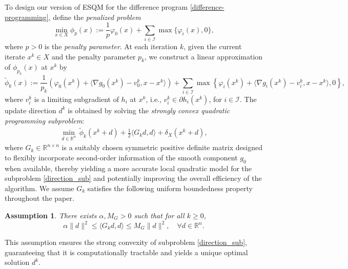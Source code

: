 \documentclass[11pt,a4paper]{article}
\newtheorem{assumption}[theorem]{Assumption}
\theoremstyle{plain}
\begin{document}
To design our version of ESQM for the difference program \eqref{difference-programming}, define the {\em penalized problem}
\begin{equation}\label{penalized_problem}
\min_{x \in X} \phi_p(x):=\frac{1}{p}\varphi_0(x)+ \sum_{i\in\mathcal{I}} \max\{\varphi_i(x),0\},
\end{equation}
where  \( p > 0 \) is the {\em penalty parameter}.  
At each iteration $k$, given the current iterate $x^k \in X$ and the penalty parameter $p_k$, we construct a linear approximation of $\phi_{p_k}(x)$ at $x^k$ by
\begin{equation}\label{eq:tilde_phi}
\tilde{ \phi}_{k}(x):= \frac{1}{p_k} \left( \varphi_0(x^k) + \langle \nabla g_0(x^k) - v_0^k, x - x^k\rangle \right) + \sum_{i\in\mathcal{I}} \max \left\{ \varphi_i(x^k) + \langle \nabla g_i(x^k) - v_i^k, x - x^k \rangle, 0 \right\}, 
\end{equation}
where $v_i^k$ is a limiting subgradient of $h_i$ at $x^k$, i.e., $v_i^k \in \partial h_i(x^k)$, for $i \in \mathcal{I}$. The update direction $d^k$ is obtained by solving the {\em strongly convex quadratic programming subproblem}:
\begin{equation}\label{direction_sub}
\begin{aligned}
\min_{d \in \mathbb{R}^n} \, \tilde{ \phi}_{k}(x^k +d) + {\frac{1}{2} \langle G_kd,d\rangle} + \delta_X(x^k + d),
\end{aligned}
\end{equation}
where $G_k \in \mathbb R^{n\times n}$ is a suitably chosen symmetric positive definite matrix designed to
flexibly incorporate second-order information of the smooth component \(g_0\) when available, thereby yielding a more accurate local quadratic model for the subproblem \eqref{direction_sub} and potentially improving the overall efficiency of the algorithm. We assume  $G_k$ satisfies the following uniform boundedness property throughout the paper.
\begin{assumption}\label{ass_G}
There exists $\alpha, M_G > 0 $ such that for all $k \ge 0$,
\[
\alpha\|d\|^2 \leq \langle G_k d, d \rangle \leq M_G \|d\|^2, \quad \forall d \in \mathbb{R}^n.   
\]
\end{assumption}
This assumption ensures the strong convexity of subproblem \eqref{direction_sub}, guaranteeing that it is computationally tractable and yields a unique optimal solution $d^k$. 
\end{document}
